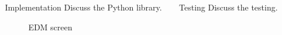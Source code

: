 \documentclass[final,t]{beamer}
\begin{document}
\begin{frame}
\begin{columns}[t]
\begin{column}{.32\linewidth}
  \end{column}



  \begin{column}{.32\linewidth}

  \begin{custombox}{Implementation}
    Discuss the Python library.
  \end{custombox}

      \begin{figure}[t]
          {%
        \setlength{\fboxsep}{0pt}%
        \setlength{\fboxrule}{3pt}%
              \caption{EDM screen}
        }%
\end{figure}

  \end{column}



  \begin{column}{.32\linewidth}

  \begin{custombox}{Testing}
    Discuss the testing.
  \end{custombox}


\end{column}
\end{columns}
\end{frame}
\end{document}
